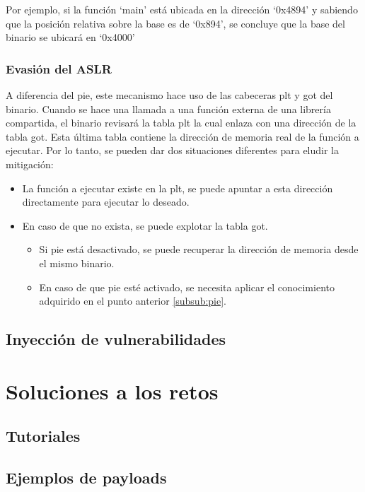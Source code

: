 Por ejemplo, si la función `main' está ubicada en la dirección `0x4894' y sabiendo que la posición relativa sobre la base es de `0x894', se concluye que la base del binario se ubicará en `0x4000'
\subsubsection{Evasión del ASLR}
A diferencia del \acrshort{pie}, este mecanismo hace uso de las cabeceras \acrfull{plt} y \acrfull{got} del binario.
Cuando se hace una llamada a una función externa de una librería compartida, el binario revisará la tabla \acrshort{plt} la cual enlaza con una dirección de la tabla \acrshort{got}.
Esta última tabla contiene la dirección de memoria real de la función a ejecutar.
Por lo tanto, se pueden dar dos situaciones diferentes para eludir la mitigación:
\begin{itemize}
    \item La función a ejecutar existe en la \acrshort{plt}, se puede apuntar a esta dirección directamente para ejecutar lo deseado.
    \item En caso de que no exista, se puede explotar la tabla \acrshort{got}.
    \begin{itemize}
        \item Si \acrshort{pie} está desactivado, se puede recuperar la dirección de memoria desde el mismo binario.
        \item En caso de que \acrshort{pie} esté activado, se necesita aplicar el conocimiento adquirido en el punto anterior \ref{subsub:pie}.
    \end{itemize}
\end{itemize}

\subsection{Inyección de vulnerabilidades} \label{subsec:vulns}

\section{Soluciones a los retos}
\subsection{Tutoriales}
\subsection{Ejemplos de payloads}